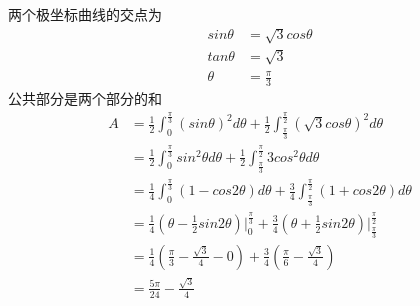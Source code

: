 \documentclass{article}
\begin{document}
两个极坐标曲线的交点为
\begin{align*}
  sin \theta & = \sqrt{3}cos \theta \\
  tan \theta & = \sqrt{3}           \\
  \theta     & = \frac{\pi}{3}
\end{align*}
公共部分是两个部分的和
\begin{align*}
  A & = \frac{1}{2} \int_0^{\frac{\pi}{3}} (sin \theta)^2 d\theta + \frac{1}{2} \int_{\frac{\pi}{3}}^{\frac{\pi}{2}} (\sqrt{3}cos \theta)^2 d\theta              \\
    & = \frac{1}{2} \int_0^{\frac{\pi}{3}} sin^2 \theta d\theta + \frac{1}{2} \int_{\frac{\pi}{3}}^{\frac{\pi}{2}} 3cos^2 \theta d\theta                         \\
    & = \frac{1}{4} \int_0^{\frac{\pi}{3}} (1 - cos2\theta) d\theta + \frac{3}{4} \int_{\frac{\pi}{3}}^{\frac{\pi}{2}} (1 + cos2 \theta) d\theta                 \\
    & = \frac{1}{4} (\theta - \frac{1}{2}sin2\theta)\bigg|_0^{\frac{\pi}{3}} + \frac{3}{4}(\theta + \frac{1}{2}sin2\theta)\bigg|_{\frac{\pi}{3}}^{\frac{\pi}{2}} \\
    & = \frac{1}{4} (\frac{\pi}{3} - \frac{\sqrt{3}}{4} - 0) + \frac{3}{4}(\frac{\pi}{6} - \frac{\sqrt{3}}{4})                                                   \\
    & = \frac{5\pi}{24} - \frac{\sqrt{3}}{4}
\end{align*}


\end{document}
